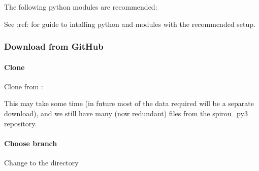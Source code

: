 \documentclass[a4paper,10pt,english]{report}
\begin{document}
The following python modules are recommended:

\begin{sphinxVerbatim}[commandchars=\\\{\}]
\end{sphinxVerbatim}

See :ref:  for guide to intalling python and modules with
the recommended setup.


\subsubsection{Download from GitHub}
\label{\detokenize{user/general/installation:download-from-github}}\label{\detokenize{user/general/installation:installation-download}}

\paragraph{Clone}
\label{\detokenize{user/general/installation:clone}}
Clone from :

\begin{sphinxVerbatim}[commandchars=\\\{\}]
   
\end{sphinxVerbatim}

This may take some time (in future most of the data required will be a separate download),
and we still have many (now redundant) files from the spirou\_py3 repository.


\paragraph{Choose branch}
\label{\detokenize{user/general/installation:choose-branch}}\label{\detokenize{user/general/installation:installation-choose-branch}}
Change to the  directory
\end{document}
